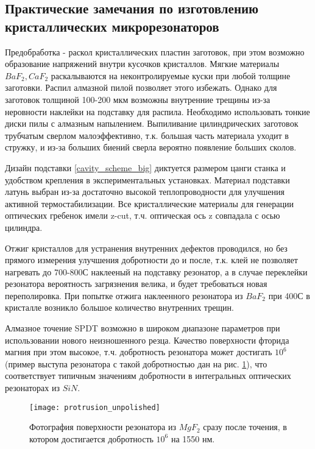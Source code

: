 \subsection{Практические замечания по изготовлению кристаллических микрорезонаторов}

Предобработка - раскол кристаллических пластин заготовок, при этом возможно образование напряжений внутри кусочков кристаллов. Мягкие материалы $BaF_2, CaF_2$ раскалываются на неконтролируемые куски при любой толщине заготовки. Распил алмазной пилой позволяет этого избежать. Однако для заготовок толщиной 100-200 мкм возможны внутренние трещины из-за неровности наклейки на подставку для распила. Необходимо использовать тонкие диски пилы с алмазным напылением. Выпиливание цилиндрических заготовок трубчатым сверлом малоэффективно, т.к. большая часть материала уходит в стружку, и из-за больших биений сверла вероятно появление больших сколов.

Дизайн подставки \ref{cavity_scheme_big} диктуется размером цанги станка и удобством крепления в экспериментальных установках. Материал подставки латунь выбран из-за достаточно высокой теплопроводности для улучшения активной термостабилизации. Все кристаллические материалы для генерации оптических гребенок имели z-cut, т.ч. оптическая ось z совпадала с осью цилиндра.

Отжиг кристаллов для устранения внутренних дефектов проводился, но без прямого измерения улучшения добротности до и после, т.к. клей не позволяет нагревать до 700-800С наклееный на подставку резонатор, а в случае переклейки резонатора вероятность загрязнения велика, и будет требоваться новая переполировка. При попытке отжига наклеенного резонатора из $BaF_2$ при 400С в кристалле возникло большое количество внутренних трещин.

Алмазное точение SPDT возможно в широком диапазоне параметров при использовании нового неизношенного резца. Качество поверхности фторида магния при этом высокое, т.ч. добротность резонатора может достигать $10^6$ (пример выступа резонатора с такой добротностью дан на рис. \ref{protrusion_unpolished}), что соответствует типичным значениям добротности в интегральных оптических резонаторах из $SiN$.

\begin{figure}[ht]
\centering
  \texttt{[image: protrusion\_unpolished]}
  \caption{Фотография поверхности резонатора из $MgF_2$ сразу после точения, в котором достигается добротность $10^6$ на 1550 нм.}
  \label{protrusion_unpolished}
\end{figure}

